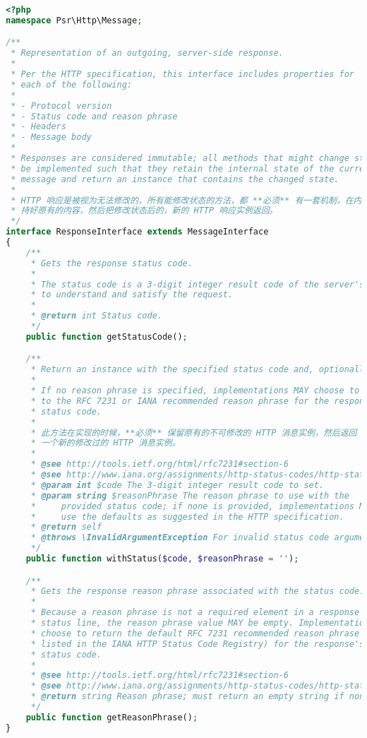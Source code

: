 \begin{lstlisting}[language=PHP]
<?php
namespace Psr\Http\Message;

/**
 * Representation of an outgoing, server-side response.
 *
 * Per the HTTP specification, this interface includes properties for
 * each of the following:
 *
 * - Protocol version
 * - Status code and reason phrase
 * - Headers
 * - Message body
 *
 * Responses are considered immutable; all methods that might change state MUST
 * be implemented such that they retain the internal state of the current
 * message and return an instance that contains the changed state.
 * 
 * HTTP 响应是被视为无法修改的，所有能修改状态的方法，都 **必须** 有一套机制，在内部保
 * 持好原有的内容，然后把修改状态后的，新的 HTTP 响应实例返回。
 */
interface ResponseInterface extends MessageInterface
{
    /**
     * Gets the response status code.
     *
     * The status code is a 3-digit integer result code of the server's attempt
     * to understand and satisfy the request.
     *
     * @return int Status code.
     */
    public function getStatusCode();

    /**
     * Return an instance with the specified status code and, optionally, reason phrase.
     *
     * If no reason phrase is specified, implementations MAY choose to default
     * to the RFC 7231 or IANA recommended reason phrase for the response's
     * status code.
     *
     * 此方法在实现的时候，**必须** 保留原有的不可修改的 HTTP 消息实例，然后返回
     * 一个新的修改过的 HTTP 消息实例。
     *
     * @see http://tools.ietf.org/html/rfc7231#section-6
     * @see http://www.iana.org/assignments/http-status-codes/http-status-codes.xhtml
     * @param int $code The 3-digit integer result code to set.
     * @param string $reasonPhrase The reason phrase to use with the
     *     provided status code; if none is provided, implementations MAY
     *     use the defaults as suggested in the HTTP specification.
     * @return self
     * @throws \InvalidArgumentException For invalid status code arguments.
     */
    public function withStatus($code, $reasonPhrase = '');

    /**
     * Gets the response reason phrase associated with the status code.
     *
     * Because a reason phrase is not a required element in a response
     * status line, the reason phrase value MAY be empty. Implementations MAY
     * choose to return the default RFC 7231 recommended reason phrase (or those
     * listed in the IANA HTTP Status Code Registry) for the response's
     * status code.
     *
     * @see http://tools.ietf.org/html/rfc7231#section-6
     * @see http://www.iana.org/assignments/http-status-codes/http-status-codes.xhtml
     * @return string Reason phrase; must return an empty string if none present.
     */
    public function getReasonPhrase();
}
\end{lstlisting}


